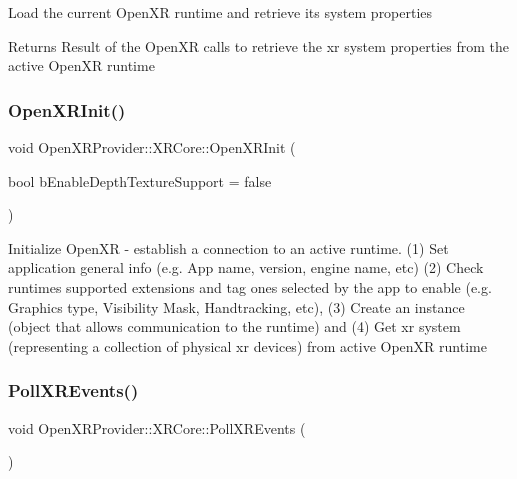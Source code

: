 Load the current Open\+XR runtime and retrieve its system properties \begin{DoxyReturn}{Returns}
Result of the Open\+XR calls to retrieve the xr system properties from the active Open\+XR runtime 
\end{DoxyReturn}
\mbox{\label{class_open_x_r_provider_1_1_x_r_core_a3ef0ea6626d9e949dd9997618058a877}} 
\subsubsection{\texorpdfstring{OpenXRInit()}{OpenXRInit()}}
{\footnotesize\ttfamily void Open\+X\+R\+Provider\+::\+X\+R\+Core\+::\+Open\+X\+R\+Init (\begin{DoxyParamCaption}\item[{bool}]{b\+Enable\+Depth\+Texture\+Support = {\ttfamily false} }\end{DoxyParamCaption})\hspace{0.3cm}{\ttfamily [private]}}

Initialize Open\+XR -\/ establish a connection to an active runtime. (1) Set application general info (e.\+g. App name, version, engine name, etc) (2) Check runtime\textquotesingle{}s supported extensions and tag ones selected by the app to enable (e.\+g. Graphics type, Visibility Mask, Handtracking, etc), (3) Create an instance (object that allows communication to the runtime) and (4) Get xr system (representing a collection of physical xr devices) from active Open\+XR runtime \mbox{\label{class_open_x_r_provider_1_1_x_r_core_af9c576e48d1b1d5eec465b8643900560}} 
\subsubsection{\texorpdfstring{PollXREvents()}{PollXREvents()}}
{\footnotesize\ttfamily void Open\+X\+R\+Provider\+::\+X\+R\+Core\+::\+Poll\+X\+R\+Events (\begin{DoxyParamCaption}{ }\end{DoxyParamCaption})}



